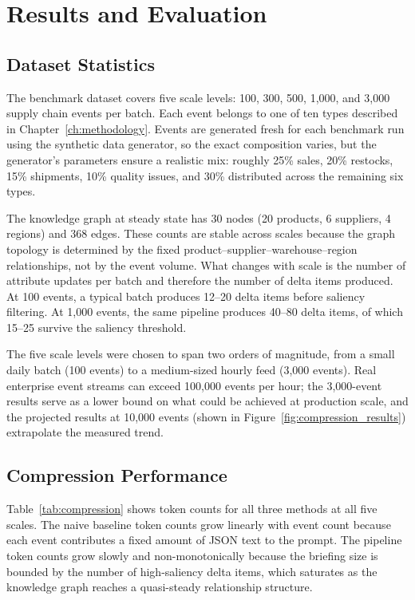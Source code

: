 \chapter{Results and Evaluation}
\label{ch:results}

\section{Dataset Statistics}
\label{sec:dataset_stats}

The benchmark dataset covers five scale levels: 100, 300, 500, 1,000, and 3,000 supply
chain events per batch. Each event belongs to one of ten types described in
Chapter~\ref{ch:methodology}. Events are generated fresh for each benchmark run using
the synthetic data generator, so the exact composition varies, but the generator's
parameters ensure a realistic mix: roughly 25\% sales, 20\% restocks, 15\% shipments,
10\% quality issues, and 30\% distributed across the remaining six types.

The knowledge graph at steady state has 30 nodes (20 products, 6 suppliers, 4 regions)
and 368 edges. These counts are stable across scales because the graph topology is
determined by the fixed product--supplier--warehouse--region relationships, not by the
event volume. What changes with scale is the number of attribute updates per batch and
therefore the number of delta items produced. At 100 events, a typical batch produces
12--20 delta items before saliency filtering. At 1,000 events, the same pipeline
produces 40--80 delta items, of which 15--25 survive the saliency threshold.

The five scale levels were chosen to span two orders of magnitude, from a small daily
batch (100 events) to a medium-sized hourly feed (3,000 events). Real enterprise event
streams can exceed 100,000 events per hour; the 3,000-event results serve as a lower
bound on what could be achieved at production scale, and the projected results at 10,000
events (shown in Figure~\ref{fig:compression_results}) extrapolate the measured trend.

\section{Compression Performance}
\label{sec:compression}

Table~\ref{tab:compression} shows token counts for all three methods at all five scales.
The naive baseline token counts grow linearly with event count because each event
contributes a fixed amount of JSON text to the prompt. The pipeline token counts grow
slowly and non-monotonically because the briefing size is bounded by the number of
high-saliency delta items, which saturates as the knowledge graph reaches a
quasi-steady relationship structure.

